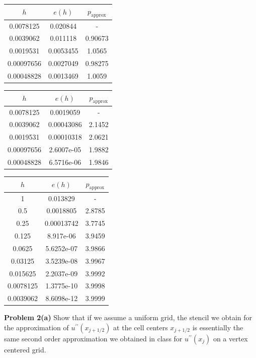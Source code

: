 \documentclass[12pt]{article}
\newcommand{\problem}[1]{\hspace{-4 ex} \large \textbf{Problem #1} }
\begin{document}
\begin{center}
	\begin{tabular}{|c|c|c|}
		\hline
		$h$&$e(h)$&$p_\text{approx}$\\ \hline
		0.0078125&0.020844&-\\ \hline
		0.0039062&0.011118&0.90673\\ \hline
		0.0019531&0.0053455&1.0565\\ \hline
		0.00097656&0.0027049&0.98275\\ \hline
		0.00048828&0.0013469&1.0059\\ \hline
	\end{tabular}
\end{center}
\begin{center}
	\begin{tabular}{|c|c|c|}
		\hline
		$h$&$e(h)$&$p_\text{approx}$\\ \hline
		0.0078125&0.0019059&-\\ \hline
		0.0039062&0.00043086&2.1452\\ \hline
		0.0019531&0.00010318&2.0621\\ \hline
		0.00097656&2.6007e-05&1.9882\\ \hline
		0.00048828&6.5716e-06&1.9846\\ \hline
	\end{tabular}
\end{center}
\begin{center}
	\begin{tabular}{|c|c|c|}
		\hline
		$h$&$e(h)$&$p_\text{approx}$\\ \hline
		1&0.013829&-\\ \hline
		0.5&0.0018805&2.8785\\ \hline
		0.25&0.00013742&3.7745\\ \hline
		0.125&8.917e-06&3.9459\\ \hline
		0.0625&5.6252e-07&3.9866\\ \hline
		0.03125&3.5239e-08&3.9967\\ \hline
		0.015625&2.2037e-09&3.9992\\ \hline
		0.0078125&1.3775e-10&3.9998\\ \hline
		0.0039062&8.6098e-12&3.9999\\ \hline
	\end{tabular}
\end{center}


\problem{2(a)} Show that if we assume a uniform grid, the stencil we obtain for the approximation of $u^{\prime\prime}(x_{j+1/2})$ at the cell centers $x_{j+1/2}$ is essentially the same second order approximation we obtained in class for $u^{\prime\prime}(x_j)$ on a vertex centered grid. \bigbreak
\end{document}
